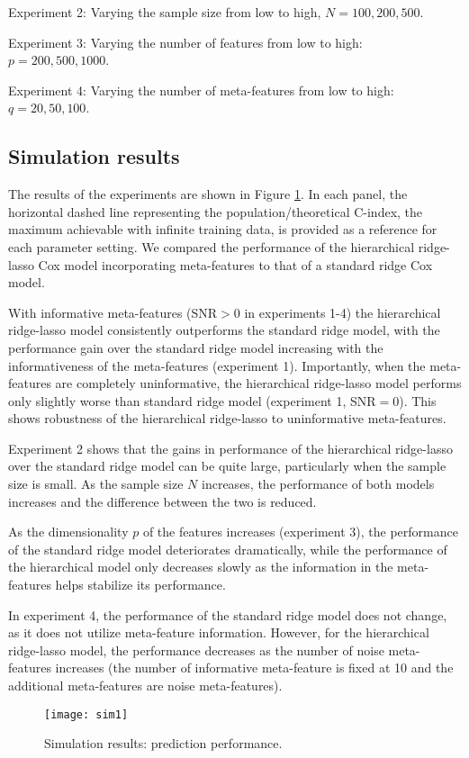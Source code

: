 Experiment 2: Varying the sample size from low to high, $N=100,200,500$.

Experiment 3: Varying the number of features from low to high: $p=200,500,1000$.

Experiment 4: Varying the number of meta-features from low to high: $q=20,50,100$.

\subsection{Simulation results}
The results of the experiments are shown in Figure \ref{fig:sim1}. In each panel, the horizontal dashed line representing the population/theoretical C-index, the maximum achievable with infinite training data, is provided as a reference for each parameter setting. We compared the performance of the hierarchical ridge-lasso Cox model incorporating meta-features to that of a standard ridge Cox model.

With informative meta-features (SNR$>0$ in experiments 1-4) the hierarchical ridge-lasso model consistently outperforms the standard ridge model, with the performance gain over the standard ridge model increasing with the informativeness of the meta-features (experiment 1). Importantly, when the meta-features are completely uninformative, the hierarchical ridge-lasso model performs only slightly worse than standard ridge model (experiment 1, SNR$=0$). This shows robustness of the hierarchical ridge-lasso to uninformative meta-features.

Experiment 2 shows that the gains in performance of the hierarchical ridge-lasso over the standard ridge model can be quite large, particularly when the sample size is small. As the sample size $N$ increases, the performance of both models increases and the difference between the two is reduced. 

As the dimensionality $p$ of the features increases (experiment 3), the performance of the standard ridge model deteriorates dramatically, while the performance of the hierarchical model only decreases slowly as the information in the meta-features helps stabilize its performance.

In experiment 4, the performance of the standard ridge model does not change, as it does not utilize meta-feature information. However, for the hierarchical ridge-lasso model, the performance decreases as the number of noise meta-features increases (the number of informative meta-feature is fixed at 10 and the additional meta-features are noise meta-features).  
\begin{figure}[tbh]
  \centering
  \texttt{[image: sim1]}
  \caption[Simulation results (`xrnet'): prediction performance]{
    Simulation results: prediction performance.
  }
  \label{fig:sim1}
\end{figure}

